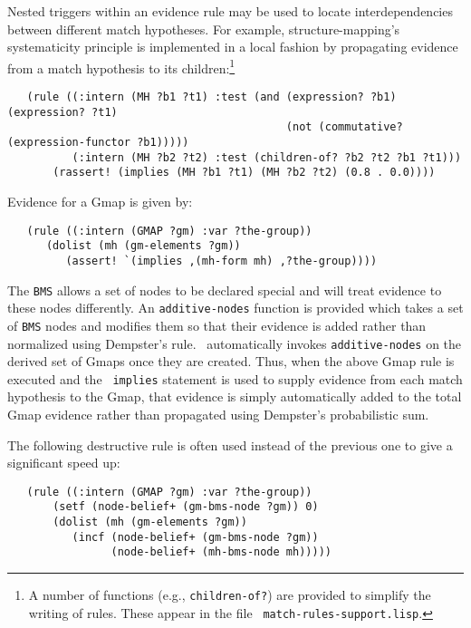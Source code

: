 Nested triggers within an evidence rule may be used to locate
interdependencies between different match hypotheses. For example,
structure-mapping's systematicity principle is implemented in a local
fashion by propagating evidence from a match hypothesis to its
children:\footnote{A number of functions (e.g., {\tt children-of?}) are
provided to simplify the writing of rules. These appear in the file {\tt
match-rules-support.lisp}.}

\begin{small}
\begin{verbatim}
   (rule ((:intern (MH ?b1 ?t1) :test (and (expression? ?b1) (expression? ?t1)
                                           (not (commutative? (expression-functor ?b1)))))
          (:intern (MH ?b2 ?t2) :test (children-of? ?b2 ?t2 ?b1 ?t1)))
       (rassert! (implies (MH ?b1 ?t1) (MH ?b2 ?t2) (0.8 . 0.0))))
\end{verbatim}
\end{small}

\noindent
Evidence for a Gmap is given by:

\begin{small}
\begin{verbatim}
   (rule ((:intern (GMAP ?gm) :var ?the-group))
      (dolist (mh (gm-elements ?gm))
         (assert! `(implies ,(mh-form mh) ,?the-group))))
\end{verbatim}
\end{small}


The {\tt BMS} allows a set of nodes to be declared special and will treat
evidence to these nodes differently. An {\tt additive-nodes} function is
provided which takes a set of {\tt BMS} nodes and modifies them so that
their evidence is added rather than normalized using Dempster's rule. \SME\
automatically invokes {\tt additive-nodes} on the derived set of Gmaps once
they are created. Thus, when the above Gmap rule is executed and the {\tt
implies} statement is used to supply evidence from each match hypothesis to
the Gmap, that evidence is simply automatically added to the total Gmap
evidence rather than propagated using Dempster's probabilistic sum.

The following destructive rule is often used instead of the previous one to
give a significant speed up:

\begin{small}
\begin{verbatim}
   (rule ((:intern (GMAP ?gm) :var ?the-group))
       (setf (node-belief+ (gm-bms-node ?gm)) 0)
       (dolist (mh (gm-elements ?gm))
          (incf (node-belief+ (gm-bms-node ?gm))
                (node-belief+ (mh-bms-node mh)))))
\end{verbatim}
\end{small}

